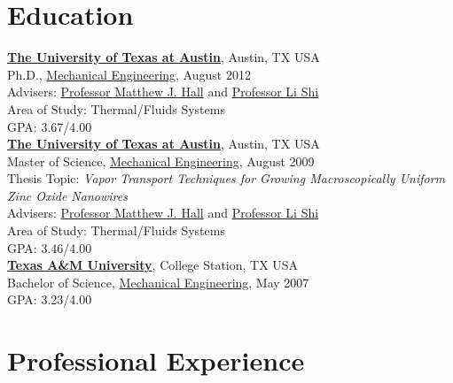 \documentclass[centered]{res}
\begin{document}
\begin{resume}
\section{Education}
%
\href{http://www.utexas.edu/}{\textbf{The University of Texas at
    Austin}}, Austin, TX USA \\
Ph.D., \href{http://www.me.utexas.edu/}{Mechanical Engineering},
August 2012 \\
Advisers:
\href{http://www.me.utexas.edu/directory/faculty/hall/matthew/33/}{Professor
  Matthew J. Hall} and \href{http://www.me.utexas.edu/~lishi/}{Professor Li Shi}\\
Area of Study: Thermal/Fluids Systems \\
GPA: 3.67/4.00 \vspace{5pt} \\
%
\href{http://www.utexas.edu/}{\textbf{The University of Texas at
    Austin}}, Austin, TX USA \\
Master of Science, \href{http://www.me.utexas.edu/}{Mechanical
  Engineering}, August
2009 \\
Thesis Topic: \emph{Vapor Transport Techniques for Growing
  Macroscopically Uniform Zinc Oxide Nanowires} \\
Advisers:
\href{http://www.me.utexas.edu/directory/faculty/hall/matthew/33/}{Professor
  Matthew J. Hall} and \href{http://www.me.utexas.edu/~lishi/}{Professor Li Shi}\\
Area of Study: Thermal/Fluids Systems \\
GPA: 3.46/4.00
\vspace{5pt} \\
%
\href{http://www.tamu.edu/}{\textbf{Texas A\&M University}}, College
Station, TX USA \\
Bachelor of Science, \href{http://www.mengr.tamu.edu/}{Mechanical
  Engineering}, May
2007  \\
GPA: 3.23/4.00

\section{Professional Experience}


\end{resume}
\end{document}
